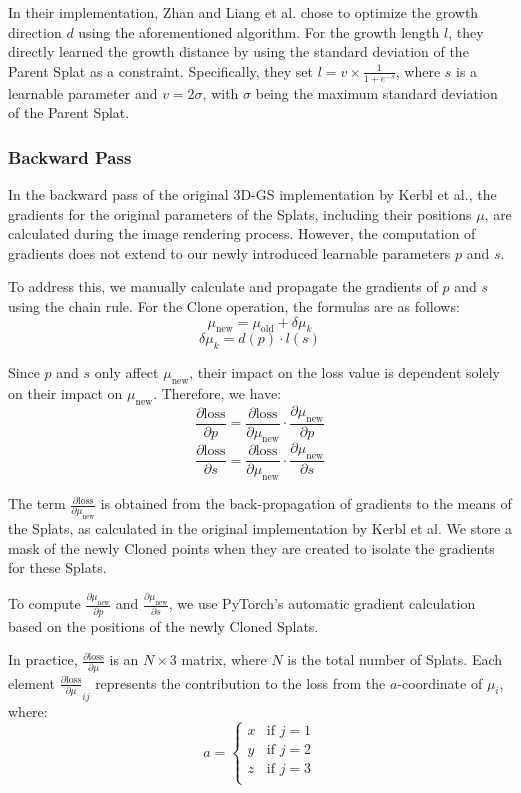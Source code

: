 \documentclass[11pt]{report}
\begin{document}
In their implementation, Zhan and Liang et al. chose to optimize the growth direction $d$ using the aforementioned algorithm. For the growth length $l$, they directly learned the growth distance by using the standard deviation of the Parent Splat as a constraint. Specifically, they set $l = v \times \frac{1}{1 + e^{-s}}$, where $s$ is a learnable parameter and $v = 2 \sigma$, with $\sigma$ being the maximum standard deviation of the Parent Splat.

\subsubsection{Backward Pass}
In the backward pass of the original 3D-GS implementation by Kerbl et al., the gradients for the original parameters of the Splats, including their positions $\mu$, are calculated during the image rendering process. However, the computation of gradients does not extend to our newly introduced learnable parameters $p$ and $s$.

To address this, we manually calculate and propagate the gradients of $p$ and $s$ using the chain rule. For the Clone operation, the formulas are as follows:
\[ \mu_{\text{new}} = \mu_{\text{old}} + \delta \mu_k \]
\[ \delta \mu_k = d(p) \cdot l(s) \]

Since $p$ and $s$ only affect $\mu_{\text{new}}$, their impact on the loss value is dependent solely on their impact on $\mu_{\text{new}}$. Therefore, we have:
\[ \frac{\partial \text{loss}}{\partial p} = \frac{\partial \text{loss}}{\partial \mu_{\text{new}}} \cdot \frac{\partial \mu_{\text{new}}}{\partial p} \]
\[ \frac{\partial \text{loss}}{\partial s} = \frac{\partial \text{loss}}{\partial \mu_{\text{new}}} \cdot \frac{\partial \mu_{\text{new}}}{\partial s} \]

The term $\frac{\partial \text{loss}}{\partial \mu_{\text{new}}}$ is obtained from the back-propagation of gradients to the means of the Splats, as calculated in the original implementation by Kerbl et al. We store a mask of the newly Cloned points when they are created to isolate the gradients for these Splats.

To compute $\frac{\partial \mu_{\text{new}}}{\partial p}$ and $\frac{\partial \mu_{\text{new}}}{\partial s}$, we use PyTorch's automatic gradient calculation based on the positions of the newly Cloned Splats.

In practice, $\frac{\partial \text{loss}}{\partial \mu}$ is an $N \times 3$ matrix, where $N$ is the total number of Splats. Each element $\frac{\partial \text{loss}}{\partial \mu}_{ij}$ represents the contribution to the loss from the $a$-coordinate of $\mu_{i}$, where:
\[ a = \begin{cases}
x & \textrm{if }j=1\\
y & \textrm{if }j=2\\
z & \textrm{if }j=3\\
\end{cases} \]
\end{document}
